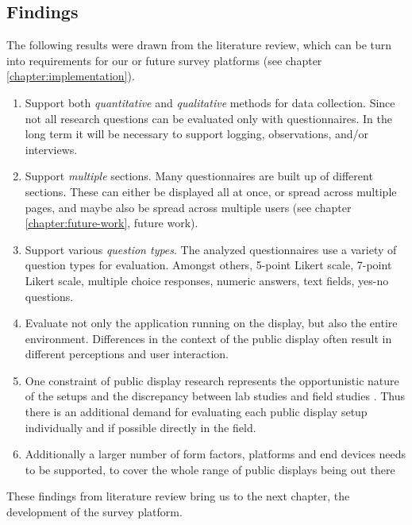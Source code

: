\subsection{Findings}
\label{section:questionnaires:findings}

	The following results were drawn from the literature review, which can be turn into requirements for our or future survey platforms (see chapter \ref{chapter:implementation}).


	\begin{enumerate}
		\item Support both \textit{quantitative} and \textit{qualitative} methods for data collection. Since not all research questions can be evaluated only with questionnaires. In the long term it will be necessary to support logging, observations, and/or interviews.

		\item Support \textit{multiple} sections. Many questionnaires are built up of different sections. These can either be displayed all at once, or spread across multiple pages, and maybe also be spread across multiple users (see chapter \ref{chapter:future-work}, future work).

		\item Support various \textit{question types}. The analyzed questionnaires use a variety of question types for evaluation. Amongst others, 5-point Likert scale, 7-point Likert scale, multiple choice responses, numeric answers, text fields, yes-no questions.

		\item Evaluate not only the application running on the display, but also the entire environment. Differences in the context of the public display often result in different perceptions and user interaction.

		\item One constraint of public display research represents the opportunistic nature of the setups and the discrepancy between lab studies and field studies \cite{Ojala2011}. Thus there is an additional demand for evaluating each public display setup individually and if possible directly in the field.

		\item Additionally a larger number of form factors, platforms and end devices needs to be supported, to cover the whole range of public displays being out there
	\end{enumerate}


	These findings from literature review bring us to the next chapter, the development of the survey platform.

